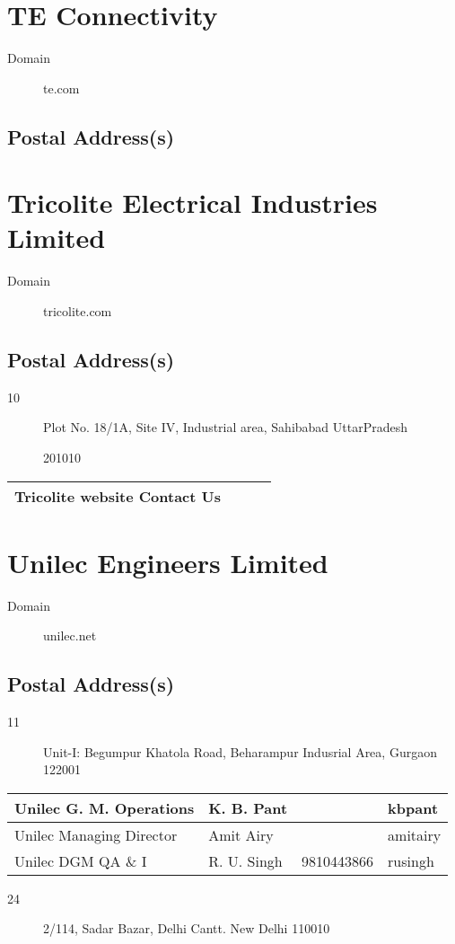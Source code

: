 \documentclass[a4paper, 11pt, twoside]{book}
\begin{document}
\section{TE Connectivity}\label{com:49}
\begin{description}
\item[Domain]te.com
\end{description}
\subsection*{Postal Address(s)}
\section{Tricolite Electrical Industries Limited}\label{com:10}
\begin{description}
\item[Domain]tricolite.com
\end{description}
\subsection*{Postal Address(s)}
\begin{description}
\item [10]Plot No. 18/1A, Site IV, Industrial area, Sahibabad UttarPradesh

 201010
\end{description}
\begin{tabular}{|p{4cm}|p{2cm}|p{2cm}|p{3cm}|}
\hline
Tricolite website Contact Us & & &  \\ \hline
\end{tabular}
\section{Unilec Engineers Limited}\label{com:9}
\begin{description}
\item[Domain]unilec.net
\end{description}
\subsection*{Postal Address(s)}
\begin{description}
\item [11]Unit-I: Begumpur Khatola Road, Beharampur Indusrial Area, Gurgaon 122001
\end{description}
\begin{tabular}{|p{4cm}|p{2cm}|p{2cm}|p{3cm}|}
\hline
Unilec G. M. Operations & K. B. Pant &  & kbpant \\ \hline
Unilec Managing Director & Amit Airy &  & amitairy \\ \hline
Unilec DGM QA \& I & R. U. Singh & 9810443866 & rusingh \\ \hline
\end{tabular}
\begin{description}
\item [24]2/114, Sadar Bazar, Delhi Cantt. New Delhi 110010
\end{description}
\end{document}
